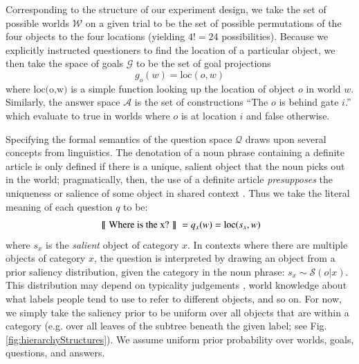 \documentclass[12pt, floatsintext, jou]{apa6}
\newcommand{\den}[2][]{
\(
\left\llbracket\;\text{#2}\;\right\rrbracket^{#1}
\)
}
\begin{document}
Corresponding to the structure of our experiment design, we take the set of possible worlds $\mathcal{W}$ on a given trial to be the set of possible permutations of the four objects to the four locations (yielding $4! = 24$ possibilities). Because we explicitly instructed questioners to find the location of a particular object, we then take the space of goals $\mathcal{G}$ to be the set of goal projections $$g_o(w) = \textrm{loc}(o,w)$$ where $\textrm{loc(o,w)}$ is a simple function looking up the location of object $o$ in world $w$. Similarly, the answer space $\mathcal{A}$ is the set of constructions ``The $o$ is behind gate $i$.'' which evaluate to true in worlds where $o$ is at location $i$ and false otherwise.

Specifying the formal semantics of the question space $\mathcal{Q}$ draws upon several concepts from linguistics. The denotation of a noun phrase containing a definite article is only defined if there is a unique, salient object that the noun picks out in the world; pragmatically, then, the use of a definite article \emph{presupposes} the uniqueness or salience of some object in shared context \cite{Lewis79_Scorekeeping, clark1983common, Roberts03_UniquenessDefiniteNounPhrases}. Thus we take the literal meaning of each question $q$ to be: 
$$\textrm{\den{Where is the x?}} = q_{x}(w) = \textrm{loc}(s_x,w)$$ where $s_x$ is the \emph{salient} object of category $x$. In contexts where there are multiple objects of category $x$, the question is interpreted by drawing an object from a prior saliency distribution, given the category in the noun phrase: $s_x \sim \mathcal{S}(o | x)$. This distribution may depend on typicality judgements \cite{Rosch75}, world knowledge about what labels people tend to use to refer to different objects, and so on. For now, we simply take the saliency prior to be uniform over all objects that are within a category (e.g. over all leaves of the subtree beneath the given label; see Fig. \ref{fig:hierarchyStructures}). We assume uniform prior probability over worlds, goals, questions, and answers.  %
\end{document}
